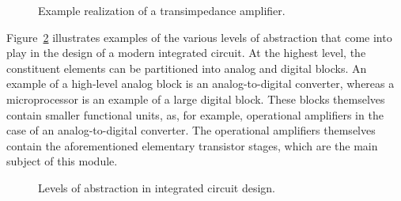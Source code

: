 \documentclass[
  11pt,
  letterpaper,
  abstract]{scrbook}
\begin{document}
\begin{figure}


\caption{\label{fig-1.5}Example realization of a transimpedance
amplifier.}

\end{figure}%

Figure~\ref{fig-1.6} illustrates examples of the various levels of
abstraction that come into play in the design of a modern integrated
circuit. At the highest level, the constituent elements can be
partitioned into analog and digital blocks. An example of a high-level
analog block is an analog-to-digital converter, whereas a microprocessor
is an example of a large digital block. These blocks themselves contain
smaller functional units, as, for example, operational amplifiers in the
case of an analog-to-digital converter. The operational amplifiers
themselves contain the aforementioned elementary transistor stages,
which are the main subject of this module.

\begin{figure}


\caption{\label{fig-1.6}Levels of abstraction in integrated circuit
design.}

\end{figure}%
\end{document}
